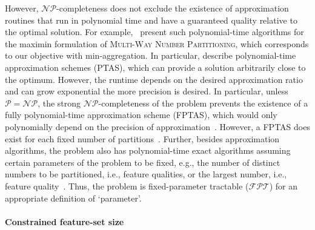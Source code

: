 \documentclass{article}
\theoremstyle{definition}
\begin{document}
However, $\mathcal{NP}$-completeness does not exclude the existence of approximation routines that run in polynomial time and have a guaranteed quality relative to the optimal solution.
For example, \cite{alon1998approximation, deuermeyer1982scheduling, woeginger1997polynomial}~present such polynomial-time algorithms for the maximin formulation of \textsc{Multi-Way Number Partitioning}, which corresponds to our objective with min-aggregation.
In particular, \cite{alon1998approximation, woeginger1997polynomial} describe polynomial-time approximation schemes (PTAS), which can provide a solution arbitrarily close to the optimum.
However, the runtime depends on the desired approximation ratio and can grow exponential the more precision is desired.
In particular, unless $\mathcal{P}=\mathcal{NP}$, the strong $\mathcal{NP}$-completeness of the problem prevents the existence of a fully polynomial-time approximation scheme (FPTAS), which would only polynomially depend on the precision of approximation~\cite{alon1998approximation, woeginger1997polynomial}.
However, a FPTAS does exist for each fixed number of partitions~\cite{sahni1976algorithms}.
Further, besides approximation algorithms, the problem also has polynomial-time exact algorithms assuming certain parameters of the problem to be fixed, e.g., the number of distinct numbers to be partitioned, i.e., feature qualities, or the largest number, i.e., feature quality~\cite{mnich2018parameterized}.
Thus, the problem is fixed-parameter tractable ($\mathcal{FPT}$) for an appropriate definition of `parameter'.

\paragraph{Constrained feature-set size}
\end{document}

